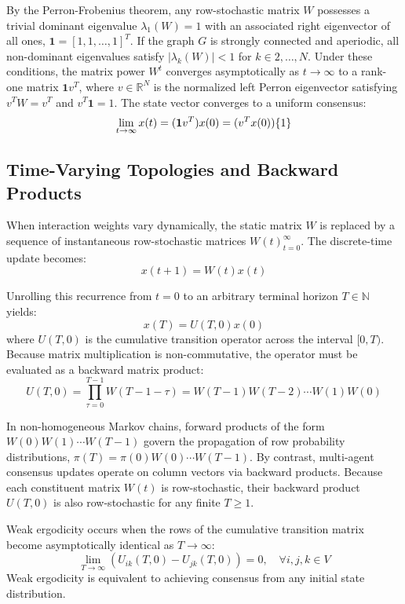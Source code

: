 By the Perron-Frobenius theorem, any row-stochastic matrix $W$ possesses a trivial dominant eigenvalue $\lambda_1(W) = 1$ with an associated right eigenvector of all ones, $\mathbf{1} = [1, 1, \dots, 1]^T$\cite{degroot1974reaching}. If the graph $G$ is strongly connected and aperiodic, all non-dominant eigenvalues satisfy $|\lambda_k(W)| < 1$ for $k \in {2, \dots, N}$\cite{degroot1974reaching}. Under these conditions, the matrix power $W^t$ converges asymptotically as $t \to \infty$ to a rank-one matrix $\mathbf{1} v^T$, where $v \in \mathbb{R}^N$ is the normalized left Perron eigenvector satisfying $v^T W = v^T$ and $v^T \mathbf{1} = 1$. The state vector converges to a uniform consensus: $$\lim_{t \to \infty} x(t) = (\mathbf{1} v^T) x(0) = (v^T x(0)) \mathbf\{1\}$$

\subsection{Time-Varying Topologies and Backward Products}
When interaction weights vary dynamically, the static matrix $W$ is replaced by a sequence of instantaneous row-stochastic matrices ${W(t)}_{t=0}^\infty$\cite{degroot1974reaching}. The discrete-time update becomes: $$x(t+1) = W(t) x(t)$$

Unrolling this recurrence from $t = 0$ to an arbitrary terminal horizon $T \in \mathbb{N}$ yields: $$x(T) = U(T, 0) x(0)$$ where $U(T, 0)$ is the cumulative transition operator across the interval $[0, T)$\cite{degroot1974reaching}. Because matrix multiplication is non-commutative, the operator must be evaluated as a backward matrix product\cite{acemoglu2013opinion}: $$U(T, 0) = \prod_{\tau=0}^{T-1} W(T - 1 - \tau) = W(T-1) W(T-2) \cdots W(1) W(0)$$

In non-homogeneous Markov chains, forward products of the form $W(0) W(1) \cdots W(T-1)$ govern the propagation of row probability distributions, $\pi(T) = \pi(0) W(0) \cdots W(T-1)$\cite{acemoglu2013opinion}. By contrast, multi-agent consensus updates operate on column vectors via backward products\cite{acemoglu2013opinion}. Because each constituent matrix $W(t)$ is row-stochastic, their backward product $U(T, 0)$ is also row-stochastic for any finite $T \ge 1$\cite{degroot1974reaching}.

Weak ergodicity occurs when the rows of the cumulative transition matrix become asymptotically identical as $T \to \infty$\cite{degroot1974reaching}: $$\lim_{T \to \infty} \left( U_{ik}(T, 0) - U_{jk}(T, 0) \right) = 0, \quad \forall i, j, k \in V$$ Weak ergodicity is equivalent to achieving consensus from any initial state distribution\cite{degroot1974reaching}.

